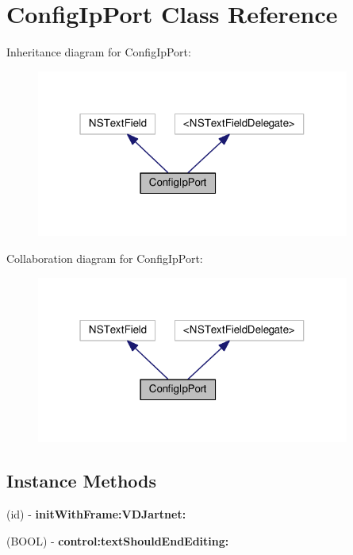 \hypertarget{interfaceConfigIpPort}{}\section{Config\+Ip\+Port Class Reference}
\label{interfaceConfigIpPort}


Inheritance diagram for Config\+Ip\+Port\+:
\nopagebreak
\begin{figure}[H]
\begin{center}
\leavevmode
\includegraphics[width=292pt]{interfaceConfigIpPort__inherit__graph}
\end{center}
\end{figure}


Collaboration diagram for Config\+Ip\+Port\+:
\nopagebreak
\begin{figure}[H]
\begin{center}
\leavevmode
\includegraphics[width=292pt]{interfaceConfigIpPort__coll__graph}
\end{center}
\end{figure}
\subsection*{Instance Methods}
\begin{DoxyCompactItemize}
\item 
(id) -\/ {\bfseries init\+With\+Frame\+:\+V\+D\+Jartnet\+:}
\item 
\mbox{\label{interfaceConfigIpPort_a06af11278d360cb589b1a7770ac21981}} 
(B\+O\+OL) -\/ {\bfseries control\+:text\+Should\+End\+Editing\+:}
\end{DoxyCompactItemize}


